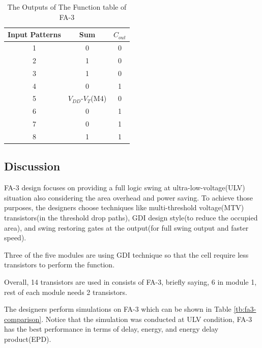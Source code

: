 \documentclass[conference]{IEEEtran}
\begin{document}
\begin{table}[!ht]
	\renewcommand{\arraystretch}{1.3}
	\caption{The Outputs of The Function table of FA-3}
	\centering
	\begin{tabular}{ c c c }
		\hline
		Input Patterns & Sum                    & \(C_{out}\) \\
		\hline
		1              & 0                      & 0           \\
		2              & 1                      & 0           \\
		3              & 1                      & 0           \\
		4              & 0                      & 1           \\
		5              & \(V_{DD}\)-\(V_T\)(M4) & 0           \\
		6              & 0                      & 1           \\
		7              & 0                      & 1           \\
		8              & 1                      & 1           \\
		\hline
	\end{tabular}
	\label{tb:fa3-func-pattern-out}
\end{table}

\subsection{Discussion}

FA-3 design focuses on providing a full logic swing at ultra-low-voltage(ULV) situation also considering the area overhead and power saving.
To achieve those purposes, the designers choose techniques like multi-threshold voltage(MTV) transistors(in the threshold drop paths),
GDI design style(to reduce the occupied area), and swing restoring gates at the output(for full swing output and faster speed).

Three of the five modules are using GDI technique so that the cell require less transistors to perform the function.

Overall, 14 transistors are used in consists of FA-3, briefly saying, 6 in module 1, rest of each module needs 2 transistors.

The designers perform simulations on FA-3 which can be shown in Table \ref{tb:fa3-comparison}.
Notice that the simulation was conducted at ULV condition, FA-3 has the best performance in terms of delay, energy, and energy delay product(EPD).
\end{document}
